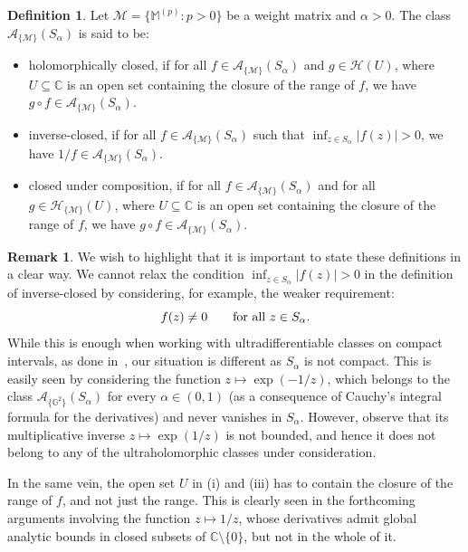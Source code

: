 \documentclass[11pt,a4paper]{article}
\theoremstyle{plain}
\theoremstyle{definition}
\newtheorem{definition}[proposition]{Definition}
\newtheorem{remark}[proposition]{Remark}
\newcommand{\CC}{\mathbb{C}}
\newcommand{\M}{\mathbb{M}}
\newcommand{\G}{\mathbb{G}}
\def\a{\alpha}
\begin{document}
\begin{definition} Let $\mathcal{M}=\{\M^{(p)}: p>0\}$ be a weight matrix and $\alpha>0$. The class $\mathcal{A}_{\{\mathcal{M}\}}(S_{\alpha})$ is said to be:
		\begin{itemize}
			\item[$(i)$] holomorphically closed, if for all $f\in\mathcal{A}_{\{\mathcal{M}\}}(S_{\alpha})$ and $g\in\mathcal{H}(U)$, where $U\subseteq\CC$ is an open set containing the closure of the range of $f$, we have $g\circ f\in\mathcal{A}_{\{\mathcal{M}\}}(S_{\alpha})$.
			\item[$(ii)$] inverse-closed, if for all $f\in\mathcal{A}_{\{\mathcal{M}\}}(S_{\alpha})$ such that  $\inf_{z\in S_\alpha}|f(z)|>0$, we have $1/f\in\mathcal{A}_{\{\mathcal{M}\}}(S_{\alpha})$.
			\item[$(iii)$] closed under composition, if for all $f\in\mathcal{A}_{\{\mathcal{M}\}}(S_{\alpha})$ and for all $g\in\mathcal{H}_{\{\mathcal{M}\}}(U)$, where $U\subseteq\CC$ is an open set containing the closure of the range of $f$, we have $g\circ f\in\mathcal{A}_{\{\mathcal{M}\}}(S_{\alpha})$.
		\end{itemize}
\end{definition}

\begin{remark}
We wish to highlight that it is important to state these definitions in a clear way. We cannot relax the condition $\inf_{z\in S_\alpha}|f(z)|>0$ in the definition of inverse-closed by considering, for example, the weaker requirement{:
$$f(z)\neq0\qquad \text{for all $ z\in S_\alpha $.}$$} While this is enough when working with ultradifferentiable classes on compact intervals, as done in~\cite{Malliavin}, our situation is different as ${S_\alpha}$ is not compact. This is easily seen by considering the function $z\mapsto \exp(-1/z)$, which belongs to the class $ \mathcal{A}_{\{\G^2\}}(S_{\a}) $ for every $\a\in(0,1)$ {(as a consequence of Cauchy's integral formula for the derivatives)} and never vanishes in $S_\a$. However, observe that its multiplicative inverse $z\mapsto \exp(1/z)$ is not bounded, and hence it does not belong to any of the ultraholomorphic classes under consideration.

In the same vein, the open set $U$ in (i) and (iii) has to contain the closure of the range of $f$, and not just the range. This is clearly seen in the forthcoming arguments involving the function $z\mapsto 1/z$, whose derivatives admit global analytic bounds in closed subsets of $\CC\setminus\{0\}$, but not in the whole of it.
\end{remark}
\end{document}
